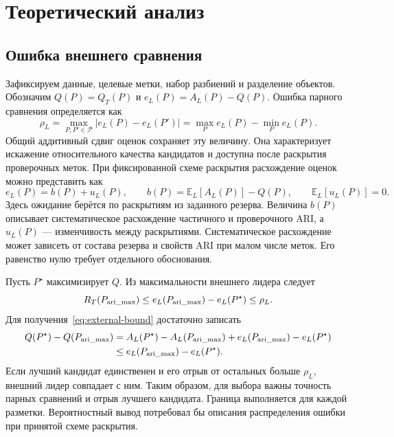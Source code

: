 \section{Теоретический анализ}\label{sec:theory}
\subsection{Ошибка внешнего сравнения}
Зафиксируем данные, целевые метки, набор разбиений и разделение объектов. Обозначим $Q(P)=Q_T(P)$ и $e_L(P)=A_L(P)-Q(P)$. Ошибка парного сравнения определяется как
\begin{equation}\label{eq:pairwise-error}
 \rho_L=\max_{P,P'\in\mathcal P}|e_L(P)-e_L(P')|
       =\max_Pe_L(P)-\min_Pe_L(P).
\end{equation}
Общий аддитивный сдвиг оценок сохраняет эту величину. Она характеризует искажение относительного качества кандидатов и доступна после раскрытия проверочных меток. При фиксированной схеме раскрытия расхождение оценок можно представить как
\begin{equation}\label{eq:error-components}
 e_L(P)=b(P)+u_L(P),\qquad b(P)=\mathbb E_L[A_L(P)]-Q(P),\qquad
 \mathbb E_L[u_L(P)]=0.
\end{equation}
Здесь ожидание берётся по раскрытиям из заданного резерва. Величина $b(P)$ описывает систематическое расхождение частичного и проверочного ARI, а $u_L(P)$ --- изменчивость между раскрытиями. Систематическое расхождение может зависеть от состава резерва и свойств ARI при малом числе меток. Его равенство нулю требует отдельного обоснования.

Пусть $P^\star$ максимизирует $Q$. Из максимальности внешнего лидера следует
\begin{equation}\label{eq:external-bound}
 R_T(P_{\mathrm{ari\_max}})\le e_L(P_{\mathrm{ari\_max}})-e_L(P^\star)\le\rho_L.
\end{equation}
Для получения~\eqref{eq:external-bound} достаточно записать
\begin{align*}
 Q(P^\star)-Q(P_{\mathrm{ari\_max}})
 &=A_L(P^\star)-A_L(P_{\mathrm{ari\_max}})+e_L(P_{\mathrm{ari\_max}})-e_L(P^\star)\\
 &\le e_L(P_{\mathrm{ari\_max}})-e_L(P^\star).
\end{align*}
Если лучший кандидат единственен и его отрыв от остальных больше $\rho_L$, внешний лидер совпадает с ним. Таким образом, для выбора важны точность парных сравнений и отрыв лучшего кандидата. Граница выполняется для каждой разметки. Вероятностный вывод потребовал бы описания распределения ошибки при принятой схеме раскрытия.

